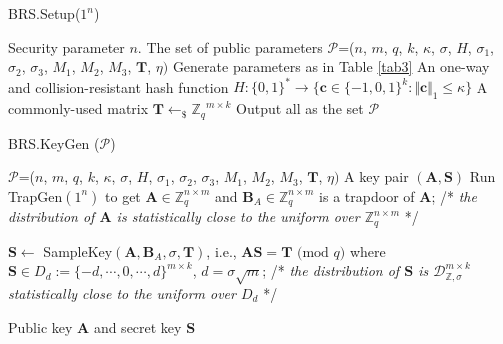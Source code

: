 \documentclass[runningheads]{llncs}
\begin{document}
\begin{algorithm}[pt]
	\caption{\textsf{BRS.Setup($1^{n}$)}}
	\begin{algorithmic}[1]
		
		\REQUIRE Security parameter $n$.
		\ENSURE The set of public parameters $\mathcal{P}$=($n$, $m$, $q$, $k$, $\kappa$, $\sigma$,  $H$, $\sigma_1$, $\sigma_2$, $\sigma_3$, $M_1$, $M_2$, $M_3$, $\mathbf{T}$, $\eta)$
		\STATE Generate parameters as in Table \ref{tab3}
		\STATE An one-way and collision-resistant hash function $H:\{0,1\}^{*} \rightarrow \{ \mathbf{c}\in \{-1,0,1\} ^{k}: \Vert \mathbf{c} \Vert_1 \leq \kappa \}$  
		\STATE A commonly-used matrix $\mathbf{T} \leftarrow_{\$} {\mathbb{Z}_q}^{m \times k}$ 
		\STATE Output all as the set $\mathcal{P}$
		
		
	\end{algorithmic}
	\label{setup}
\end{algorithm}




\begin{algorithm}[pt]
	\caption{\textsf{BRS.KeyGen ($\mathcal{P}$)}}
	\begin{algorithmic}[1]
		
		\REQUIRE $\mathcal{P}$=($n$, $m$, $q$, $k$, $\kappa$, $\sigma$,  $H$, $\sigma_1$, $\sigma_2$, $\sigma_3$, $M_1$, $M_2$, $M_3$, $\mathbf{T}$, $\eta)$
		\ENSURE A key pair $(\mathbf{A},\mathbf{S})$
		\STATE Run \textsf{TrapGen}$(1^n)$ to get $\mathbf{A}\in \mathbb{Z}_q^{n \times m}$ and $\mathbf{B}_{A}\in \mathbb{Z}_q^{n\times m}$ is a trapdoor of $\mathbf{A}$; /* \textit{the distribution of $\mathbf{A}$ is statistically close to the  uniform over $\mathbb{Z}_q^{n\times m} $} */
		
		\STATE $\mathbf{S}  \leftarrow$ \textsf{SampleKey}$(\mathbf{A}, \mathbf{B}_{A}, \sigma,\mathbf{T})$, i.e., $\mathbf{A}\mathbf{S}=\mathbf{T} \text{ (mod } q)$ where $\mathbf{S} \in D_d:=\{-d, \cdots, 0, \cdots, d\}^{m \times k}$, $d=\sigma\sqrt{m} $; /* \textit{the distribution of $\mathbf{S}$ is $\mathcal{D}_{\mathbb{Z}, \sigma}^{m \times k}$ statistically close to the uniform over $D_d $} */
		
		\RETURN Public key $\mathbf{A}$ and secret key $\mathbf{S}$
	\end{algorithmic}
	\label{keygen}
\end{algorithm}
\end{document}
